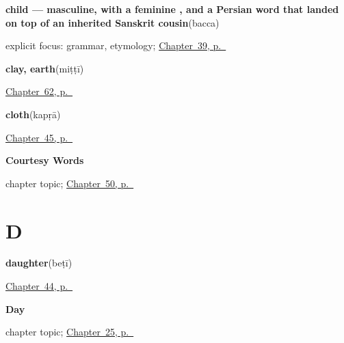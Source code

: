 \noindent\begin{minipage}[t]{\linewidth}
\raggedright
\textbf{child — masculine, with a feminine , and a Persian word that landed on top of an inherited Sanskrit cousin}\enspace\emph{}\enspace(bacca)\par
\footnotesize explicit focus: grammar, etymology; \hyperref[ch:hi-people-around-you]{Chapter~39, p.~\pageref*{ch:hi-people-around-you}}
\end{minipage}\par\smallskip

\noindent\begin{minipage}[t]{\linewidth}
\raggedright
\textbf{clay, earth}\enspace\emph{}\enspace(miṭṭī)\par
\footnotesize \hyperref[ch:hi-what-hands-work-with]{Chapter~62, p.~\pageref*{ch:hi-what-hands-work-with}}
\end{minipage}\par\smallskip

\noindent\begin{minipage}[t]{\linewidth}
\raggedright
\textbf{cloth}\enspace\emph{}\enspace(kapṛā)\par
\footnotesize \hyperref[ch:hi-ask-for]{Chapter~45, p.~\pageref*{ch:hi-ask-for}}
\end{minipage}\par\smallskip

\noindent\begin{minipage}[t]{\linewidth}
\raggedright
\textbf{Courtesy Words}\par
\footnotesize chapter topic; \hyperref[ch:hi-courtesy]{Chapter~50, p.~\pageref*{ch:hi-courtesy}}
\end{minipage}\par\smallskip

\section*{D}

\noindent\begin{minipage}[t]{\linewidth}
\raggedright
\textbf{daughter}\enspace\emph{}\enspace(beṭī)\par
\footnotesize \hyperref[ch:hi-sons-daughters]{Chapter~44, p.~\pageref*{ch:hi-sons-daughters}}
\end{minipage}\par\smallskip

\noindent\begin{minipage}[t]{\linewidth}
\raggedright
\textbf{Day}\par
\footnotesize chapter topic; \hyperref[ch:hi-day]{Chapter~25, p.~\pageref*{ch:hi-day}}
\end{minipage}\par\smallskip

